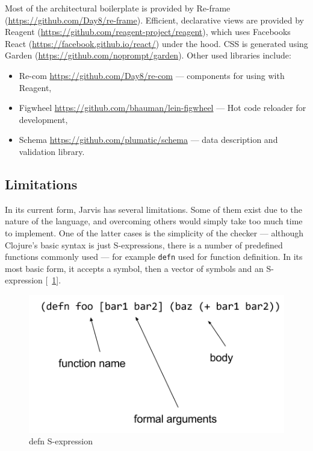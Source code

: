 \documentclass[11pt]{scrartcl}
\newcommand*{\figref}[1]{[\textbf{\figurename}~\ref{#1}]}
\begin{document}
Most of the architectural boilerplate is provided by Re-frame
(\url{https://github.com/Day8/re-frame}).
Efficient, declarative views are provided by Reagent
(\url{https://github.com/reagent-project/reagent}), which uses Facebooks React
(\url{https://facebook.github.io/react/}) under the hood.
CSS is generated using Garden (\url{https://github.com/noprompt/garden}).
Other used libraries include:
\begin{itemize}
  \item Re-com \url{https://github.com/Day8/re-com} --- components for using with
    Reagent,
    
  \item Figwheel \url{https://github.com/bhauman/lein-figwheel} --- Hot code
    reloader for development,
    
  \item Schema \url{https://github.com/plumatic/schema} --- data description and
    validation library.
    
\end{itemize}

\subsection{Limitations}
In its current form, Jarvis has several limitations.
Some of them exist due to the nature of the language, and overcoming others
would simply take too much time to implement.
One of the latter cases is the simplicity of the checker --- although Clojure’s
basic syntax is just S-expressions, there is a number of predefined functions
commonly used --- for example \lstinline|defn| used for function definition.
In its most basic form, it accepts a symbol, then a vector of symbols and an
S-expression \figref{fig:sexp}.

\begin{figure}[hbt]
  \centering
  \includegraphics[scale=0.5]{img/sexp}
  \caption{defn S-expression}
\label{fig:sexp}
\end{figure}
\end{document}
